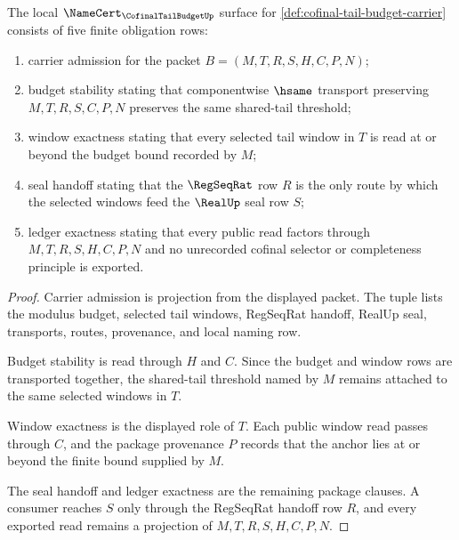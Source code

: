 \begin{theorem}
\label{thm:cofinal-tail-budget-namecert-obligations}
The local $\NameCert_{\CofinalTailBudgetUp}$ surface for \autoref{def:cofinal-tail-budget-carrier} consists of five finite obligation rows:
\begin{enumerate}
\item carrier admission for the packet $B=(M,T,R,S,H,C,P,N)$;
\item budget stability stating that componentwise $\hsame$ transport preserving $M,T,R,S,C,P,N$ preserves the same shared-tail threshold;
\item window exactness stating that every selected tail window in $T$ is read at or beyond the budget bound recorded by $M$;
\item seal handoff stating that the $\RegSeqRat$ row $R$ is the only route by which the selected windows feed the $\RealUp$ seal row $S$;
\item ledger exactness stating that every public read factors through $M,T,R,S,H,C,P,N$ and no unrecorded cofinal selector or completeness principle is exported.
\end{enumerate}
\end{theorem}
\begin{proof}
Carrier admission is projection from the displayed packet. The tuple lists the modulus budget, selected tail windows, RegSeqRat handoff, RealUp seal, transports, routes, provenance, and local naming row.

Budget stability is read through $H$ and $C$. Since the budget and window rows are transported together, the shared-tail threshold named by $M$ remains attached to the same selected windows in $T$.

Window exactness is the displayed role of $T$. Each public window read passes through $C$, and the package provenance $P$ records that the anchor lies at or beyond the finite bound supplied by $M$.

The seal handoff and ledger exactness are the remaining package clauses. A consumer reaches $S$ only through the RegSeqRat handoff row $R$, and every exported read remains a projection of $M,T,R,S,H,C,P,N$.
\end{proof}

